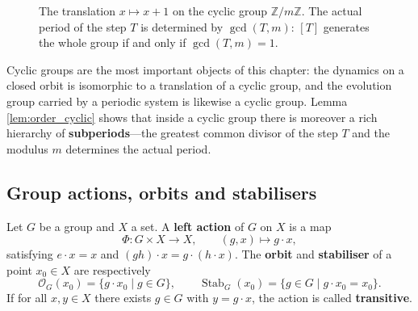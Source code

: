 \begin{figure}[htbp]
\centering
{}
\caption{The translation $x\mapsto x+1$ on the cyclic group $\mathbb Z/m\mathbb Z$. The actual period of the step $T$ is determined by $\gcd(T,m)$: $[T]$ generates the whole group if and only if $\gcd(T,m)=1$.}
\label{fig:cyclic_order}
\end{figure}

\begin{remark}\label{rem:cyclic_prototype}
Cyclic groups are the most important objects of this chapter: the dynamics on a closed orbit is isomorphic to a translation of a cyclic group, and the evolution group carried by a periodic system is likewise a cyclic group. Lemma \ref{lem:order_cyclic} shows that inside a cyclic group there is moreover a rich hierarchy of \textbf{subperiods}---the greatest common divisor of the step $T$ and the modulus $m$ determines the actual period.
\end{remark}

\subsection{Group actions, orbits and stabilisers}

\begin{definition}\label{def:group_action}
Let $G$ be a group and $X$ a set. A \textbf{left action} of $G$ on $X$ is a map
\[
\Phi:G\times X\to X,\qquad (g,x)\mapsto g\cdot x,
\]
satisfying $e\cdot x=x$ and $(gh)\cdot x=g\cdot(h\cdot x)$. The \textbf{orbit} and \textbf{stabiliser} of a point $x_0\in X$ are respectively
\[
\mathcal{O}_G(x_0)=\{g\cdot x_0\mid g\in G\},\qquad
\operatorname{Stab}_G(x_0)=\{g\in G\mid g\cdot x_0=x_0\}.
\]
If for all $x,y\in X$ there exists $g\in G$ with $y=g\cdot x$, the action is called \textbf{transitive}.
\end{definition}


